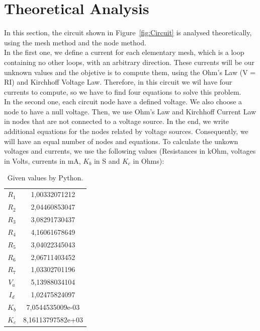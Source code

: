 \newpage
\section{Theoretical Analysis}
\label{sec:analysis}
In this section, the circuit shown in Figure~\ref{fig:Circuit} is analysed
theoretically, using the mesh method and the node method. \\
In the first one, we define a current for each elementary mesh, 
which is a loop containing no other loops, with an arbitrary direction.
These currents will be our unknown values and the objetive is to compute them, using the Ohm's Law (V = RI) and Kirchhoff Voltage Law. 
Therefore, in this circuit we wil have four currents to compute, so we have to find four equations to solve this problem. \\
\noindent In the second one, each circuit node have a defined voltage. We also choose a node to have a null voltage.
Then, we use Ohm's Law and Kirchhoff Current Law in nodes that are not connected to a voltage source.
In the end, we write additional equations for the nodes related by voltage sources.
Consequently, we will have an equal number of nodes and equations.
To calculate the unkown voltages and currents, we use the following values (Resistances in kOhm, voltages in Volts, currents in mA, $K_b$ in S and $K_c$ in Ohms):
\begin{table}[h!]
\centering
\begin{small}
\caption{Given values by Python.} \label{Table1}
\begin{tabular}{|c|c|}
\hline
$R_1$ & 1,00332071212 \\
$R_2$  & 2,04460853047 \\
$R_3$  & 3,08291730437 \\
$R_4$ & 4,16061678649 \\
$R_5$  & 3,04022345043 \\
$R_6$ & 2,06711403452 \\
$R_7$ & 1,03302701196 \\
$V_a$ & 5,13988034104\\
$I_d$ & 1,02475824097 \\
$K_b$ & 7,0544535009e-03 \\
$K_c$ & 8,16113797582e+03\\
\hline
\end{tabular}
\end{small}
\end{table}

\newpage


